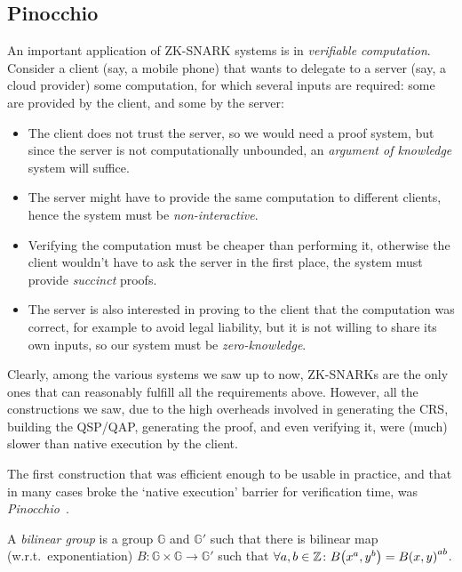 \subsection{Pinocchio}
An important application of ZK-SNARK systems is in \emph{verifiable computation}.
Consider a client (say, a mobile phone) that wants to delegate to a server (say, a cloud provider) 
some computation, for which several inputs are required: some are provided by the client, 
and some by the server:
\begin{itemize}
  \item The client does not trust the server, so we would need a proof system, but since the server 
        is not computationally unbounded, an \emph{argument of knowledge} system will suffice.
  \item The server might have to provide the same computation to different clients, hence 
        the system must be \emph{non-interactive}.
  \item Verifying the computation must be cheaper than performing it, otherwise the client wouldn't 
        have to ask the server in the first place, the system must provide \emph{succinct} proofs.
  \item The server is also interested in proving to the client that the computation was correct, for
        example to avoid legal liability, but it is not willing to share its own inputs, so our 
        system must be \emph{zero-knowledge}.
\end{itemize}
Clearly, among the various systems we saw up to now, ZK-SNARKs are the only ones that can reasonably 
fulfill all the requirements above.
However, all the constructions we saw, due to the high overheads involved in generating the CRS, 
building the QSP/QAP, generating the proof, and even verifying it, were (much) slower than native 
execution by the client.

The first construction that was efficient enough to be usable in practice, and that in many cases
broke the `native execution' barrier for verification time, was 
\emph{Pinocchio}~\cite{ParnoGHR2013}.
\begin{definition}
  A \emph{bilinear group} is a group \(\mathbb{G}\) and \(\mathbb{G}'\) 
  such that there is bilinear map (w.r.t.\ exponentiation) 
  \(B\colon \mathbb{G} \times \mathbb{G} \to \mathbb{G}'\) such that 
  \(\forall a, b \in \mathbb{Z}\colon \call{B}{x^a, y^b} = \call{B}{x, y}^{ab}\).
\end{definition}

